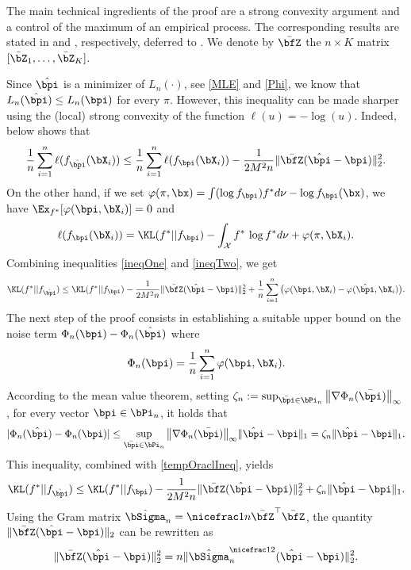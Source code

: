 The main technical ingredients of the proof are a strong convexity argument and a control of
the maximum of an empirical process. The corresponding results are stated in 
and , respectively, deferred to  . We denote by 
$\bar\bfZ$ the $n\times K$ matrix $[\bar\bZ_1,\ldots,\bar\bZ_K]$.

Since $\hat\bpi$ is a minimizer of $L_n(\cdot)$, see \eqref{MLE} and \eqref{Phi}, we know that
$L_n(\hat\bpi)\le L_n(\bpi)$ for every $\pi$. However, this inequality can be made sharper using the
(local) strong convexity of the function $\ell(u) = -\log(u)$. Indeed,  below
shows that
\begin{equation}\label{ineqOne}
    \frac{1}{n}\sum_{i=1}^n \ell(f_{\hat\bpi}(\bX_i)) \leq
    \frac{1}{n}\sum_{i=1}^n \ell(f_{\bpi}(\bX_i)) - \frac{1}{2M^2n}\|\bar\bfZ(\hat\bpi-\bpi)\|^2_2.
\end{equation}
On the other hand, if we set $\varphi(\pi,\bx) = \int (\log f_{\bpi})f^*d\nu -\log f_{\bpi}(\bx)$, 
we have $\Ex_{f^*}[\varphi(\bpi,\bX_i)]=0$ and
\begin{equation}\label{ineqTwo}
\ell(f_{\bpi}(\bX_i)) = \KL(f^*||f_{\bpi}) -\int_{\mathcal X} f^*\,\log f^*d\nu+\varphi(\pi,\bX_i).
\end{equation}
Combining inequalities \eqref{ineqOne} and \eqref{ineqTwo}, we get
\begin{equation}
\label{tempOraclIneq}
\KL(f^*|| f_{\hat\bpi}) \leq \KL(f^*|| f_{\bpi})-\frac{1}{2M^2n}\|\bar\bfZ(\hat\bpi-\bpi)\|_2^2
+ \frac1n\sum_{i=1}^n \big(\varphi(\bpi,\bX_i)-\varphi(\hat\bpi,\bX_i)\big).
\end{equation}
The next step of the proof consists in establishing a suitable upper bound on the noise term
$\Phi_n(\bpi)-\Phi_n(\hat\bpi)$
where
\begin{equation}
\Phi_n(\bpi) = \frac1n\sum_{i=1}^n \varphi(\bpi,\bX_i).
\end{equation}
According to the mean value theorem, setting  $\zeta_n:= \sup_{\bar\bpi\in\bPi_n}\big\| \nabla \Phi_n(\bar\bpi)\big\|_\infty$,
for every vector $\bpi\in \bPi_n$,
it holds that
\begin{equation}
  |\Phi_n(\hat\bpi)-\Phi_n(\bpi)|\leq \sup_{\bar\bpi\in\bPi_n}\big\| \nabla \Phi_n(\bar\bpi)\big\|_\infty \|\hat\bpi-\bpi \|_1 =
  \zeta_n \|\hat\bpi-\bpi \|_1.
\end{equation}
This inequality, combined  with \eqref{tempOraclIneq}, yields
\begin{equation}
\label{midIneqRes}
\KL(f^*|| f_{\hat\bpi}) \leq \KL(f^*|| f_{\bpi})-\frac{1}{2M^2n}\|\bar\bfZ(\hat\bpi-\bpi)\|_2^2
+ \zeta_n\|\hat\bpi - \bpi \|_1.
\end{equation}
Using the Gram matrix $\hat\bSigma_n = \nicefrac1n\bar\bfZ^\top\bar\bfZ$, the quantity 
$\|\bar\bfZ(\hat\bpi - \bpi)\|_2$ can be rewritten as
\begin{equation}
\label{gramRewrite}
  \|\bar\bfZ(\hat\bpi - \bpi)\|_2^2 = n\|\hat\bSigma_n^{\nicefrac12} (\hat\bpi - \bpi)\|_2^2.
\end{equation}

